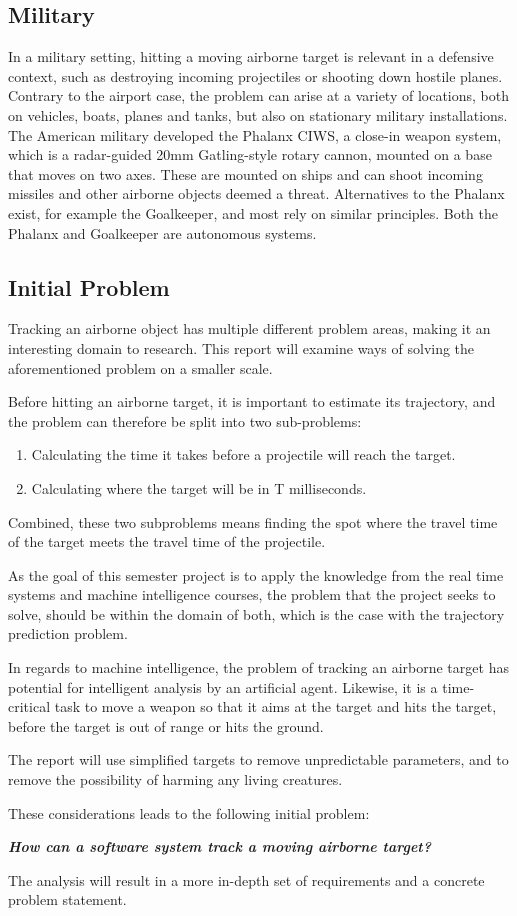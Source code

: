 \subsection{Military}
In a military setting, hitting a moving airborne target is relevant in a defensive context, such as destroying incoming projectiles or shooting down hostile planes.
Contrary to the airport case, the problem can arise at a variety of locations, both on vehicles, boats, planes and tanks, but also on stationary military installations.
The American military developed the Phalanx CIWS, a close-in weapon system, which is a radar-guided 20mm Gatling-style rotary cannon, mounted on a base that moves on two axes.
These are mounted on ships and can shoot incoming missiles and other airborne objects deemed a threat.
Alternatives to the Phalanx exist, for example the Goalkeeper, and most rely on similar principles.
Both the Phalanx and Goalkeeper are autonomous systems.

\subsection{Initial Problem}
Tracking an airborne object has multiple different problem areas, making it an interesting domain to research.
This report will examine ways of solving the aforementioned problem on a smaller scale.

Before hitting an airborne target, it is important to estimate its trajectory, and the problem can therefore be split into two sub-problems:
\begin{enumerate}
  \item Calculating the time it takes before a projectile will reach the target.
  \item Calculating where the target will be in T milliseconds.
\end{enumerate}
Combined, these two subproblems means finding the spot where the travel time of the target meets the travel time of the projectile.

As the goal of this semester project is to apply the knowledge from the real time systems and machine intelligence courses, the problem that the project seeks to solve, should be within the domain of both, which is the case with the trajectory prediction problem.

In regards to machine intelligence, the problem of tracking an airborne target has potential for intelligent analysis by an artificial agent.
Likewise, it is a time-critical task to move a weapon so that it aims at the target and hits the target, before the target is out of range or hits the ground.

The report will use simplified targets to remove unpredictable parameters, and to remove the possibility of harming any living creatures.

These considerations leads to the following initial problem:
\label{key:initialProblem}
\begin{center}
  \textit{\textbf{How can a software system track a moving airborne target?}}
\end{center}
The analysis will result in a more in-depth set of requirements and a concrete problem statement.
